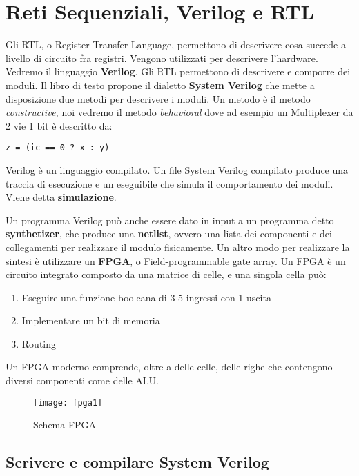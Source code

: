 \chapter{Reti Sequenziali, Verilog e RTL}

Gli RTL, o Register Transfer Language, permettono di descrivere cosa succede a livello di circuito fra registri. Vengono utilizzati per descrivere l'hardware. Vedremo il linguaggio \textbf{Verilog}. Gli RTL permettono di descrivere e comporre dei moduli. Il libro di testo propone il dialetto \textbf{System Verilog} che mette a disposizione due metodi per descrivere i moduli. Un metodo è il metodo \textit{constructive}, noi vedremo il metodo \textit{behavioral} dove ad esempio un Multiplexer da 2 vie 1 bit è descritto da:
\begin{lstlisting}[style={verilog}]
	z = (ic == 0 ? x : y)
\end{lstlisting}

Verilog è un linguaggio compilato. Un file System Verilog compilato produce una traccia di esecuzione e un eseguibile che simula il comportamento dei moduli. Viene detta \textbf{simulazione}.

Un programma Verilog può anche essere dato in input a un programma detto \textbf{synthetizer}, che produce una \textbf{netlist}, ovvero una lista dei componenti e dei collegamenti per realizzare il modulo fisicamente. Un altro modo per realizzare la sintesi è utilizzare un \textbf{FPGA}, o Field-programmable gate array. Un FPGA è un circuito integrato composto da una matrice di celle, e una singola cella può:
\begin{enumerate}
	\item Eseguire una funzione booleana di 3-5 ingressi con 1 uscita 
	\item Implementare un bit di memoria
	\item Routing
\end{enumerate} 

Un FPGA moderno comprende, oltre a delle celle, delle righe che contengono diversi componenti come delle ALU.

\begin{figure}[H]
	\centering
	\texttt{[image: fpga1]}
	\caption{Schema FPGA}
\end{figure}

\section{Scrivere e compilare System Verilog}

